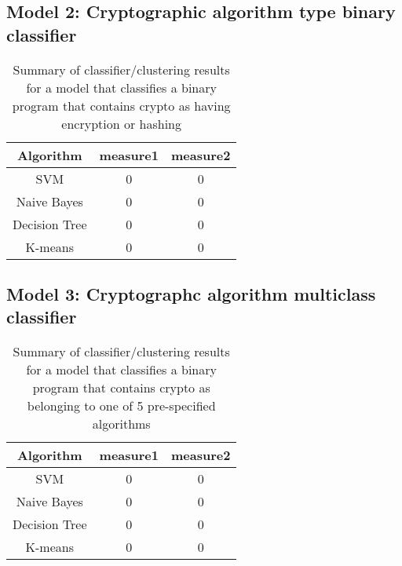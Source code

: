 \subsection{Model 2: Cryptographic algorithm type binary classifier}
\begin{center}
\begin{table}
\begin{tabular}{c|cc}
\textbf{Algorithm} & \textbf{measure1} & \textbf{measure2}\\
\hline
SVM & 0 & 0\\
Naive Bayes & 0 & 0\\
Decision Tree & 0 & 0\\
K-means & 0 & 0 \\
\end{tabular}
\caption{Summary of classifier/clustering results for a model that classifies a binary program that contains crypto as having encryption or hashing}\label{model2}
\end{table}
\end{center}

\subsection{Model 3: Cryptographc algorithm multiclass classifier}
\begin{center}
\begin{table}
\begin{tabular}{c|cc}
\textbf{Algorithm} & \textbf{measure1} & \textbf{measure2}\\
\hline
SVM & 0 & 0\\
Naive Bayes & 0 & 0\\
Decision Tree & 0 & 0\\
K-means & 0 & 0 \\
\end{tabular}
\caption{Summary of classifier/clustering results for a model that classifies a binary program that contains crypto as belonging to one of 5 pre-specified algorithms}\label{model3}
\end{table}
\end{center}

